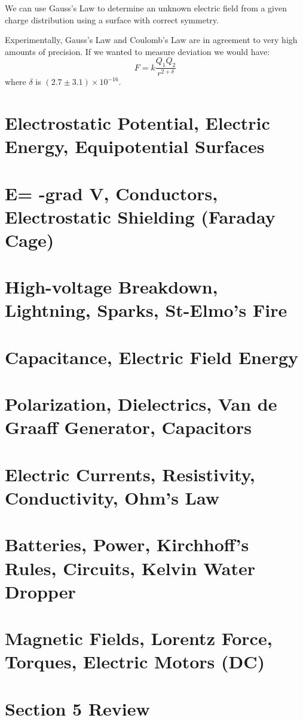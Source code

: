 \documentclass[../introphysics.tex]{subfiles}
\begin{document}
We can use Gauss's Law to determine an unknown electric field from a given charge distribution using a surface with correct symmetry. 

Experimentally, Gauss's Law and Coulomb's Law are in agreement to very high amounts of precision. 
If we wanted to measure deviation we would have:
\[F=k\frac{Q_1Q_2}{r^{2+\delta}}\]
where $\delta$ is $(2.7\pm 3.1)\times10^{-16}$.

\section{Electrostatic Potential, Electric Energy, Equipotential Surfaces}
\section{E= -grad V, Conductors, Electrostatic Shielding (Faraday Cage)}
\section{High-voltage Breakdown, Lightning, Sparks, St-Elmo's Fire}
\section{Capacitance, Electric Field Energy}
\section{Polarization, Dielectrics, Van de Graaff Generator, Capacitors}
\section{Electric Currents, Resistivity, Conductivity, Ohm's Law}
\section{Batteries, Power, Kirchhoff's Rules, Circuits, Kelvin Water Dropper}
\section{Magnetic Fields, Lorentz Force, Torques, Electric Motors (DC)}
\section{Section 5 Review}
\end{document}
